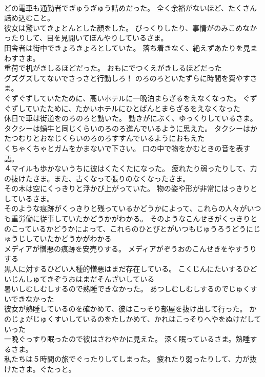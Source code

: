 \documentclass[8pt]{extreport}
\begin{document}
\begin{CJK}{UTF8}{min}
\\	どの電車も通勤者でぎゅうぎゅう詰めだった。	全く余裕がないほど、たくさん詰め込むこと。
\\	彼女は驚いてきょとんとした顔をした。	びっくりしたり、事情がのみこめなかったりして、目を見開いてぼんやりしているさま。
\\	田舎者は街中できょろきょろとしていた。	落ち着きなく、絶えずあたりを見まわすさま。
\\	重荷で机がきしるほどだった。	おもにでつくえがきしるほどだった 
\\	グズグズしてないでさっさと行動しろ！	のろのろといたずらに時間を費やすさま。
\\	ぐずぐずしていたために、高いホテルに一晩泊まらざるをえなくなった。	ぐずぐずしていたために、たかいホテルにひとばんとまらざるをえなくなった 
\\	休日で車は街道をのろのろと動いた。	動きがにぶく、ゆっくりしているさま。
\\	タクシーは蝸牛と同じくらいのろのろ進んでいるように思えた。	タクシーはかたつむりとおなじくらいのろのろすすんでいるようにおもえた 
\\	くちゃくちゃとガムをかまないで下さい。	口の中で物をかむときの音を表す語。
\\	４マイルも歩かないうちに彼はくたくたになった。	疲れたり弱ったりして、力の抜けたさま。また、古くなって張りのなくなったさま。
\\	その木は空にくっきりと浮かび上がっていた。	物の姿や形が非常にはっきりとしているさま。
\\	そのような痕跡がくっきりと残っているかどうかによって、これらの人々がいつも重労働に従事していたかどうかがわかる。	そのようなこんせきがくっきりとのこっているかどうかによって、これらのひとびとがいつもじゅうろうどうにじゅうじしていたかどうかがわかる 
\\	メディアが憎悪の痕跡を安売りする。	メディアがぞうおのこんせきをやすうりする 
\\	黒人に対するひどい人種的憎悪はまだ存在している。	こくじんにたいするひどいじんしゅてきぞうおはまだそんざいしている 
\\	暑いしむしむしするので熟睡できなかった。	あつしむしむしするのでじゅくすいできなかった 
\\	彼女が熟睡しているのを確かめて、彼はこっそり部屋を抜け出して行った。	かのじょがじゅくすいしているのをたしかめて、かれはこっそりへやをぬけだしていった 
\\	一晩ぐっすり眠ったので彼はさわやかに見えた。	深く眠っているさま。熟睡するさま。
\\	私たちは５時間の旅でぐったりしてしまった。	疲れたり弱ったりして、力が抜けたさま。ぐたっと。

\end{CJK}
\end{document}
